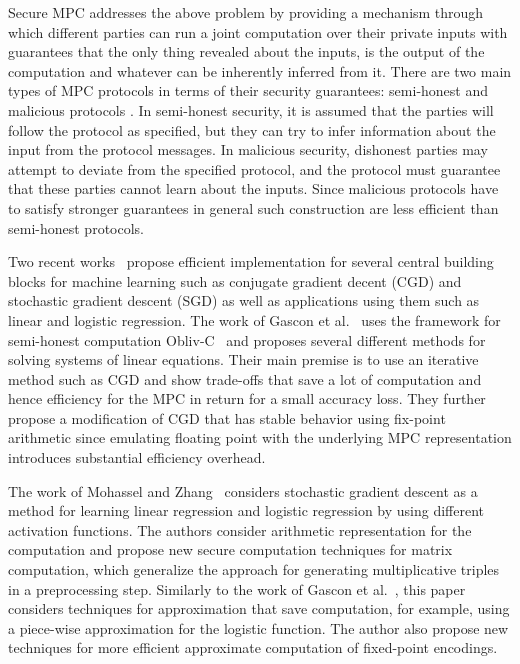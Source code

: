 \documentclass{article}
\begin{document}
Secure MPC addresses the above problem by providing a mechanism through which different parties can run a joint computation over their private inputs with guarantees that the only thing
revealed about the inputs, is the output of the computation and whatever can be inherently inferred from it.
There are two main types of MPC protocols in terms of their security guarantees: semi-honest and malicious protocols \cite{Goldreich:2004:FCV:975541, cryptoeprint:2010:551}. In semi-honest security, it is assumed that the parties will follow the protocol as specified, but they can try to infer information about the input from the protocol messages. In malicious security, dishonest parties may attempt to deviate from the specified protocol, and the protocol must guarantee that these parties cannot learn about the inputs. Since malicious protocols have to satisfy stronger guarantees in general such construction are less efficient than semi-honest protocols.

Two recent works~\cite{GSB0DZE17, MZ17} propose efficient implementation for several central building blocks for machine learning such as conjugate gradient decent (CGD) and stochastic gradient descent (SGD) as well as applications  using them such as linear and logistic regression.  The work of Gascon et al.~\cite{GSB0DZE17} uses the framework for semi-honest computation Obliv-C~\cite{cryptoeprint:2015:1153} and proposes
several different methods for solving systems of linear equations. Their main premise is to use an iterative method such as CGD and show trade-offs that save a lot of computation and hence efficiency for the MPC in
return for a small accuracy loss. They further propose a modification of CGD that has stable behavior using fix-point arithmetic since emulating floating point with the underlying MPC representation introduces substantial
efficiency overhead.

The work of Mohassel and Zhang~\cite{MZ17} considers stochastic gradient descent as a method for learning linear regression and logistic regression by using different activation functions. The authors consider
arithmetic representation for the computation and propose new secure computation techniques for matrix computation, which generalize the approach for generating multiplicative triples in a preprocessing step.
 Similarly to the work of Gascon et al.~\cite{GSB0DZE17}, this paper considers techniques for approximation that save computation, for example, using a piece-wise approximation for the logistic function. The author
 also propose new techniques for more efficient approximate computation of fixed-point encodings.
\end{document}
